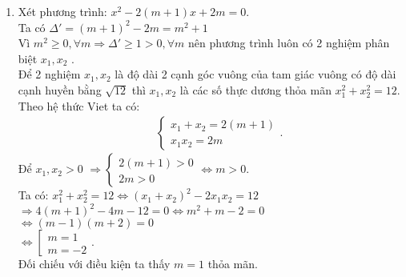 \begin{ex}
{\begin{enumerate}
\item Xét  phương trình: $x^2 - 2(m+1)x + 2m = 0$.\\
Ta có $\Delta ' = (m+1)^2-2m=m^2+1$\\
Vì $m^2 \ge 0, \forall m \Rightarrow \Delta' \ge 1 > 0, \forall m$ nên phương trình luôn có 2 nghiệm phân biệt $x_1, x_2$ .\\
Để  2 nghiệm $x_1,x_2$  là độ dài 2 cạnh góc vuông của tam giác vuông có độ dài cạnh huyền bằng $\sqrt {12} $ thì $x_1,x_2$ là các số thực dương thỏa mãn $x_1^2 + x_2^2 = 12$.\\ 
Theo hệ thức Viet ta có:
\begin{eqnarray*}
&&\left\{ \begin{array}{l}
x_1 + x_2 = 2(m+1)\\
x_1x_2 = 2m
\end{array} \right..
\end{eqnarray*}
Để $x_1,x_2 > 0$ $ \Rightarrow \left\{ \begin{array}{l}
2\left( {m + 1} \right) > 0\\
2m > 0
\end{array} \right. \Leftrightarrow m > 0$.\\
Ta có: $x_1^2 + x_2^2 = 12 \Leftrightarrow (x_1 + x_2)^2 - 2x_1x_2 = 12$\\
$ \Rightarrow 4(m+1)^2 - 4m - 12 = 0 \Leftrightarrow m^2 + m - 2 = 0$\\
$ \Leftrightarrow (m-1)(m+2) = 0$\\
$ \Leftrightarrow \left[ \begin{array}{l}
m = 1\\
m =  - 2
\end{array} \right.$.\\
Đối chiếu với điều kiện ta thấy $m = 1$  thỏa mãn.

\end{enumerate}


}
\end{ex}

